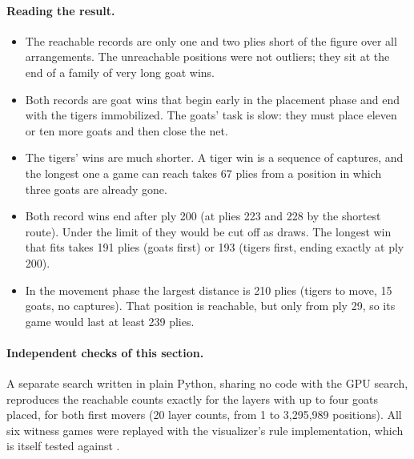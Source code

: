 \paragraph{Reading the result.}
\begin{itemize}
\item The reachable records are only one and two plies short of the figure over all arrangements. The
  unreachable positions were not outliers; they sit at the end of a family of very long goat wins.
\item Both records are goat wins that begin early in the placement phase and end with the tigers
  immobilized. The goats' task is slow: they must place eleven or ten more goats and then close the net.
\item The tigers' wins are much shorter. A tiger win is a sequence of captures, and the longest one a game
  can reach takes 67 plies from a position in which three goats are already gone.
\item Both record wins end after ply 200 (at plies 223 and 228 by the shortest route). Under the limit of
   they would be cut off as draws. The longest win that fits takes 191 plies (goats first) or
  193 (tigers first, ending exactly at ply 200).
\item In the movement phase the largest distance is 210 plies (tigers to move, 15 goats, no captures). That
  position is reachable, but only from ply 29, so its game would last at least 239 plies.
\end{itemize}

\paragraph{Independent checks of this section.} A separate search written in plain Python, sharing no code
with the GPU search, reproduces the reachable counts exactly for the layers with up to four goats placed, for
both first movers (20 layer counts, from 1 to 3{,}295{,}989 positions). All six witness games were replayed
with the visualizer's rule implementation, which is itself tested against .

